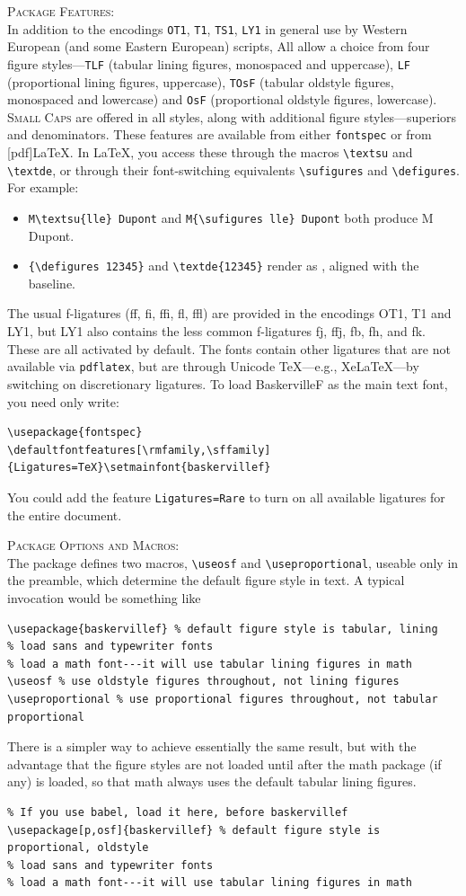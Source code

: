 \documentclass[11pt]{article}
\begin{document}
\textsc{Package Features:}\\
In addition to the encodings {\tt OT1}, {\tt T1}, {\tt TS1}, {\tt LY1}
in general use by Western European (and some Eastern European)
scripts, All allow a choice from four figure styles---{\tt TLF}
(tabular lining figures, monospaced and uppercase), {\tt LF}
(proportional lining figures, uppercase), {\tt TOsF} (tabular oldstyle
figures, monospaced and lowercase) and {\tt OsF} (proportional
oldstyle figures, lowercase).  \textsc{Small Caps} are offered in all
styles, along with additional figure styles---superiors and
denominators. These features are available from either \verb|fontspec|
or from [pdf]\LaTeX. In \LaTeX, you access these through the macros
\verb|\textsu| and \verb|\textde|, or through their font-switching
equivalents \verb|\sufigures| and \verb|\defigures|. For example:
\begin{itemize}
\item
\verb|M\textsu{lle} Dupont| and \verb|M{\sufigures lle} Dupont| both produce M Dupont.
\item  \verb|{\defigures 12345}| and \verb|\textde{12345}| render as , aligned with the baseline.
\end{itemize}
The usual f-ligatures (ff, fi, ffi, fl, ffl) are provided in the encodings OT1, T1 and LY1, but LY1 also contains the less common f-ligatures fj, ffj, fb, fh, and fk. These are all activated by default. The fonts contain other ligatures that are not available via {\tt pdflatex}, but are through Unicode TeX---e.g., XeLaTeX---by switching on discretionary ligatures. To load BaskervilleF as the main text font, you need only write:
\begin{verbatim}
\usepackage{fontspec}
\defaultfontfeatures[\rmfamily,\sffamily]{Ligatures=TeX}\setmainfont{baskervillef}
\end{verbatim}
You could add the feature {\tt Ligatures=Rare} to turn on all available ligatures for the entire document.

\textsc{Package Options and Macros:}\\
The package defines two macros, \verb|\useosf| and \verb|\useproportional|, useable only in the preamble, which determine the default figure style in text. A typical invocation would be something like
\begin{verbatim}
\usepackage{baskervillef} % default figure style is tabular, lining
% load sans and typewriter fonts
% load a math font---it will use tabular lining figures in math
\useosf % use oldstyle figures throughout, not lining figures
\useproportional % use proportional figures throughout, not tabular proportional
\end{verbatim}
There is a simpler way to achieve essentially the same result, but with the advantage that the figure styles are not loaded until after the math package (if any) is loaded, so that math always uses the default tabular lining figures. 
\begin{verbatim}
% If you use babel, load it here, before baskervillef
\usepackage[p,osf]{baskervillef} % default figure style is proportional, oldstyle
% load sans and typewriter fonts
% load a math font---it will use tabular lining figures in math
\end{verbatim}
\end{document}

